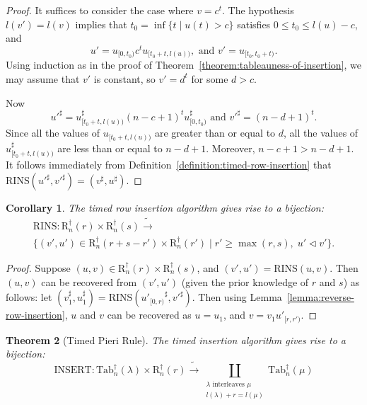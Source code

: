 \documentclass[10pt]{amsproc}
\newtheorem{theorem}{Theorem}[subsection]
\newtheorem{corollary}[theorem]{Corollary}
\theoremstyle{definition}
\theoremstyle{remark}
\newcommand{\rowins}{\mathrm{RINS}}
\newcommand{\ins}{\mathrm{INSERT}}
\newcommand{\ttab}{\mathrm{Tab}^\dagger}
\newcommand{\tr}{\mathrm{R}^\dagger}
\begin{document}
\begin{proof}
  It suffices to consider the case where $v=c^t$.
  The hypothesis $l(v')=l(v)$ implies that $t_0=\inf\{t\mid u(t)>c\}$ satisfies $0\leq t_0\leq l(u)-c$, and
  \begin{displaymath}
    u'=u_{[0,t_0)}c^tu_{[t_0+t,l(u))}, \text{ and } v'=u_{[t_0,t_0+t)}.
  \end{displaymath}
  Using induction as in the proof of Theorem~\ref{theorem:tableauness-of-insertion}, we may assume that $v'$ is constant, so $v'=d^t$ for some $d>c$.

  Now
  \begin{displaymath}
    {u'}^\sharp=u_{[t_0+t,l(u))}^\sharp (n-c+1)^t u_{[0,t_0)}^\sharp \text{ and } {v'}^\sharp=(n-d+1)^t.
  \end{displaymath}
  Since all the values of $u_{[t_0+t,l(u))}$ are greater than or equal to $d$, all the values of $u_{[t_0+t,l(u))}^\sharp$ are less than or equal to $n-d+1$.
  Moreover, $n-c+1>n-d+1$.
  It follows immediately from Definition~\ref{definition:timed-row-insertion} that $\rowins({u'}^\sharp,{v'}^\sharp)=(v^\sharp,u^\sharp)$.
\end{proof}
\begin{corollary}
  \label{corollary:row-insertion-bijection}
  The timed row insertion algorithm gives rise to a bijection:
  \begin{multline*}
    \rowins: \tr_n(r)\times \tr_n(s) \tilde\to \\\{(v',u')\in \tr_n(r+s-r')\times \tr_n(r')\mid r'\geq \max(r,s),\; u'\lhd v'\}. 
  \end{multline*}
\end{corollary}
\begin{proof}
  Suppose $(u,v)\in \tr_n(r)\times \tr_n(s)$, and $(v',u')=\rowins(u,v)$.
  Then $(u,v)$ can be recovered from $(v',u')$ (given the prior knowledge of $r$ and $s$) as follows:
  let $(v_1^\sharp, u_1^\sharp)=\rowins({u'_{[0,r)}}^\sharp, {v'}^\sharp)$.
  Then using Lemma~\ref{lemma:reverse-row-insertion}, $u$ and $v$ can be recovered as $u=u_1$, and $v=v_1u'_{[r,r')}$.
\end{proof}
\begin{theorem}[Timed Pieri Rule]
  \label{theorem:pieri}
  The timed insertion algorithm gives rise to a bijection:
  \begin{displaymath}
    \ins: \ttab_n(\lambda)\times \tr_n(r) \tilde\to \coprod_{\begin{smallmatrix}\text{$\lambda$ interleaves $\mu$}\\{l(\lambda)+r = l(\mu)}\end{smallmatrix}} \ttab_n(\mu)
  \end{displaymath}
\end{theorem}
\end{document}

